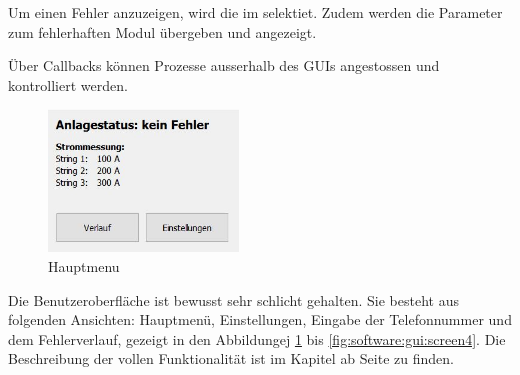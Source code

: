 Um einen Fehler anzuzeigen, wird die  im 
selektiet. Zudem werden  die Parameter zum fehlerhaften  Modul \"ubergeben und
angezeigt.

\"Uber  Callbacks  k\"onnen  Prozesse  ausserhalb  des  GUIs  angestossen  und
kontrolliert werden.

\clearpage
\begin{figure}
    \includegraphics[width=0.45\textwidth]{images/userguide/screen0.jpg}
    \caption{Hauptmenu}
    \label{fig:software:gui:screen0}
\end{figure}

Die Benutzeroberfl\"ache  ist bewusst sehr schlicht  gehalten. Sie besteht aus
folgenden Ansichten: Hauptmen\"u, Einstellungen, Eingabe der Telefonnummer und
dem Fehlerverlauf,  gezeigt in den  Abbildungej \ref{fig:software:gui:screen0}
bis     \ref{fig:software:gui:screen4}. Die     Beschreibung    der     vollen
Funktionalit\"at  ist  im  Kapitel \emph{}  ab  Seite
\pageref{chap:userguide} zu finden.

